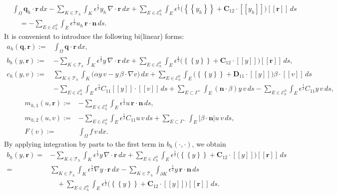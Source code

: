\documentclass[a4paper,10pt]{article}
\newcommand {\average}[1] {\mbox{$\left\{\!\!\left\{ #1 \right\}\!\!\right\}$}}
\newcommand {\jump}[1] {\mbox{$\left[\!\left[ #1 \right]\!\right]$}}
\newcommand{\hF}{{\frac{1}{2}}}
\newcommand{\cT}{{\mathcal{T}}}
\newcommand{\cE}{{\mathcal{E}}}
\newcommand{\bq}{{\mathbf{q}}}
\newcommand{\br}{{\mathbf{r}}}
\newcommand{\bn}{{\mathbf{n}}}
\numberwithin{theorem}{section}
\begin{document}
\begin{align*}
&\int_{\Omega} \bq_h \cdot \br \, dx  
- \sum\limits_{K \in \cT_h} \int_{K} \epsilon^{\hF} y_h \, \nabla \cdot \br \, dx  
+ \sum\limits_{E \in \cE_h^0} \int_E \epsilon^{\hF} 
\big( \average{y_h} + \mathbf{C}_{12} \cdot \jump{y_h} \big) 
\jump{\br} \, ds \\
&\quad = -\sum\limits_{E \in \cE_h^{\partial}} \int_E \epsilon^{\hF} u_h \, \br \cdot \bn \, ds.
\end{align*}
It is convenient to introduce the following bi(linear) forms:
\begin{align*}
a_h(\bq, \br) :=& \int_{\Omega} \bq \cdot \br \, dx, \\[0.3em]
b_h(y, \br) :=& -\sum\limits_{K \in \cT_h} \int_{K} \epsilon^{\hF} y \, \nabla \cdot \br \, dx  
+ \sum\limits_{E \in \cE_h^0} \int_E \epsilon^{\hF} 
\big( \average{y} + \mathbf{C}_{12} \cdot \jump{y} \big) \jump{\br} \, ds, \\[0.3em]
c_h(y, v) :=& \sum\limits_{K \in \cT_h} \int_{K} 
\big( \alpha y \, v - y \, \beta \cdot \nabla v \big) \, dx  
+ \sum\limits_{E \in \cE_h^0} \int_E 
\big( \average{y} + \mathbf{D}_{11} \cdot \jump{y} \big) 
\beta \cdot \jump{v} \, ds \\
& - \sum\limits_{E \in \cE_h^0} \int_E \epsilon^{\hF} C_{11} \jump{y} \cdot \jump{v} \, ds 
+ \sum\limits_{E \subset \Gamma^+} \int_E (\bn \cdot \beta) y \, v \, ds 
- \sum\limits_{E \in \cE_h^{\partial}} \int_E \epsilon^{\hF} C_{11} y \, v \, ds,
\end{align*}
\begin{align*}
m_{h,1}(u, \br) :=& -\sum\limits_{E \in \cE_h^{\partial}} \int_E \epsilon^{\hF} u \, \br \cdot \bn \, ds, \\[0.3em]
m_{h,2}(u, v) :=&  -\sum\limits_{E \in \cE_h^{\partial}} \int_E \epsilon^{\hF} C_{11} u \, v \, ds  
+ \sum\limits_{E \subset \Gamma^-} \int_E |\beta \cdot \bn| u \, v \, ds, \\[0.3em]
F(v) :=& \int_{\Omega} f \, v \, dx.
\end{align*}
By applying integration by parts to the first term in $b_h(\cdot,\cdot)$, we obtain
\begin{align*}
b_h(y, \br) 
=& -\sum\limits_{K \in \cT_h} \int_{K} \epsilon^{\hF} y \, \nabla \cdot \br \, dx  
   + \sum\limits_{E \in \cE_h^0} \int_E \epsilon^{\hF} 
   \big( \average{y} + \mathbf{C}_{12} \cdot \jump{y} \big) 
   \jump{\br} \, ds \\
=&  \sum\limits_{K \in \cT_h} \int_{K} \epsilon^{\hF} 
   \nabla y \cdot \br \, dx 
   - \sum\limits_{K \in \cT_h} \int_{\partial K} \epsilon^{\hF} 
   y \, \br \cdot \bn \, ds \\
&\quad + \sum\limits_{E \in \cE_h^0} \int_E \epsilon^{\hF} 
   \big( \average{y} + \mathbf{C}_{12} \cdot \jump{y} \big) 
   \jump{\br} \, ds.
\end{align*}
\end{document}
